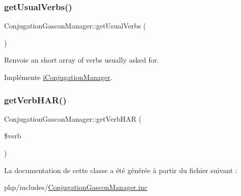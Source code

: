 \hypertarget{class_conjugation_gascon_manager_a4117ecff48a5baa29d894f6174d88983}{}\label{class_conjugation_gascon_manager_a4117ecff48a5baa29d894f6174d88983} 
\subsubsection{\texorpdfstring{get\+Usual\+Verbs()}{getUsualVerbs()}}
{\footnotesize\ttfamily Conjugation\+Gascon\+Manager\+::get\+Usual\+Verbs (\begin{DoxyParamCaption}{ }\end{DoxyParamCaption})}

\begin{DoxyReturn}{Renvoie}
an short array of verbs usually asked for. 
\end{DoxyReturn}


Implémente \hyperlink{interfacei_conjugation_manager_a2a7ed39313c1c92ef5c01c88895de36e}{i\+Conjugation\+Manager}.

\hypertarget{class_conjugation_gascon_manager_a1a76a0fddebe5b28b70b532d28b0de2d}{}\label{class_conjugation_gascon_manager_a1a76a0fddebe5b28b70b532d28b0de2d} 
\subsubsection{\texorpdfstring{get\+Verb\+H\+A\+R()}{getVerbHAR()}}
{\footnotesize\ttfamily Conjugation\+Gascon\+Manager\+::get\+Verb\+H\+AR (\begin{DoxyParamCaption}\item[{}]{\$verb }\end{DoxyParamCaption})}



La documentation de cette classe a été générée à partir du fichier suivant \+:\begin{DoxyCompactItemize}
\item 
php/includes/\hyperlink{_conjugation_gascon_manager_8inc}{Conjugation\+Gascon\+Manager.\+inc}\end{DoxyCompactItemize}
